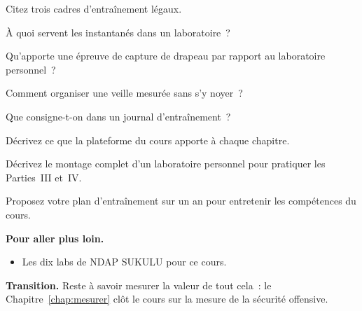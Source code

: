 \begin{boxexo}[title={\ding{45}\quad Exercice~25.3. Cadres \niveaubase}]
Citez trois cadres d'entraînement légaux.
\end{boxexo}

\begin{boxexo}[title={\ding{45}\quad Exercice~25.4. Instantanés \niveaumoyen}]
À quoi servent les instantanés dans un laboratoire~?
\end{boxexo}

\begin{boxexo}[title={\ding{45}\quad Exercice~25.5. Capture de drapeau \niveaumoyen}]
Qu'apporte une épreuve de capture de drapeau par rapport au laboratoire
personnel~?
\end{boxexo}

\begin{boxexo}[title={\ding{45}\quad Exercice~25.6. Veille \niveaumoyen}]
Comment organiser une veille mesurée sans s'y noyer~?
\end{boxexo}

\begin{boxexo}[title={\ding{45}\quad Exercice~25.7. Journal \niveaumoyen}]
Que consigne-t-on dans un journal d'entraînement~?
\end{boxexo}

\begin{boxexo}[title={\ding{45}\quad Exercice~25.8. NDAP SUKULU \niveaumoyen}]
Décrivez ce que la plateforme du cours apporte à chaque chapitre.
\end{boxexo}

\begin{boxexo}[title={\ding{45}\quad Exercice~25.9. Montage \niveauexpert}]
Décrivez le montage complet d'un laboratoire personnel pour pratiquer les
Parties~III et~IV.
\end{boxexo}

\begin{boxexo}[title={\ding{45}\quad Exercice~25.10. Plan annuel \niveauexpert}]
Proposez votre plan d'entraînement sur un an pour entretenir les compétences
du cours.
\end{boxexo}

\bigskip

\begin{boxinfo}
\textbf{Pour aller plus loin.}
\begin{itemize}
    \item Les dix labs de NDAP SUKULU pour ce cours.
\end{itemize}
\end{boxinfo}

\begin{boxinfo}
\textbf{Transition.} Reste à savoir mesurer la valeur de tout cela~: le
Chapitre~\ref{chap:mesurer} clôt le cours sur la mesure de la sécurité
offensive.
\end{boxinfo}
